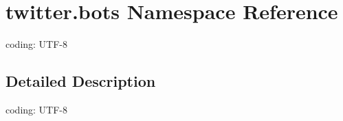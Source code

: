 \hypertarget{namespacetwitter_1_1bots}{}\section{twitter.\+bots Namespace Reference}
\label{namespacetwitter_1_1bots}


coding\+: U\+T\+F-\/8  




\subsection{Detailed Description}
coding\+: U\+T\+F-\/8 